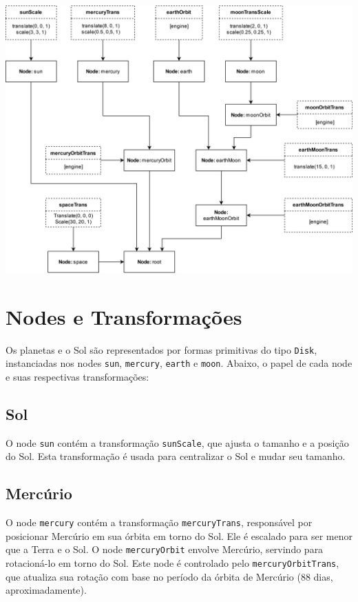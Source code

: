 \documentclass[11pt, a4paper]{article}
\begin{document}
\includegraphics[width=\linewidth]{Trab1Graph.png}

\section {Nodes e Transformações}

Os planetas e o Sol são representados por formas primitivas do tipo 
\texttt{Disk}, instanciadas nos nodes \texttt{sun}, \texttt{mercury}, 
\texttt{earth} e \texttt{moon}. Abaixo, o papel de cada node e suas 
respectivas transformações:

\subsection{Sol}
O node \texttt{sun} contém a transformação \texttt{sunScale}, que ajusta o 
tamanho e a posição do Sol. Esta transformação é usada para centralizar o Sol e 
mudar seu tamanho.

\subsection{Mercúrio}
O node \texttt{mercury} contém a transformação \texttt{mercuryTrans}, responsável 
por posicionar Mercúrio em sua órbita em torno do Sol. Ele é escalado para ser 
menor que a Terra e o Sol. O node \texttt{mercuryOrbit} envolve Mercúrio, 
servindo para rotacioná-lo em torno do Sol. Este node é controlado pelo
\texttt{mercuryOrbitTrans}, que atualiza sua rotação com base no período da 
órbita de Mercúrio (88 dias, aproximadamente).
\end{document}
